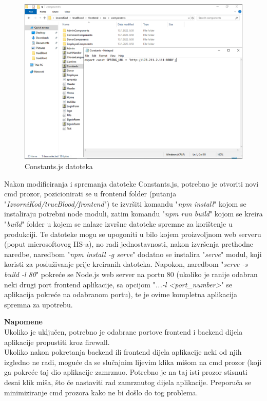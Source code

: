 			\begin{figure}[H]
			\centering
			\includegraphics[width=\textwidth, scale=0.5]{slike/ConstantsJs}
			\caption{Constants.js datoteka}
			\label{fig:ConstantsJs}
			\end{figure}
			
			Nakon modificiranja i spremanja datoteke Constants.js, potrebno je otvoriti novi cmd prozor, pozicionirati se u frontend folder (putanja "\textit{IzvorniKod/trueBlood/frontend}") te izvršiti komandu "\textit{npm install}" kojom se instaliraju potrebni node moduli, zatim komandu "\textit{npm run build}" kojom se kreira "\textit{build}" folder u kojem se nalaze izvršne datoteke spremne za korištenje u produkciji. Te datoteke mogu se upogoniti u bilo kojem proizvoljnom web serveru (poput microsoftovog IIS-a), no radi jednostavnosti, nakon izvršenja prethodne naredbe, naredbom "\textit{npm install -g serve}" dodatno se instalira "\textit{serve}" modul, koji koristi za posluživanje prije kreiranih datoteka. Napokon, naredbom "\textit{serve -s build -l 80}" pokreće se Node.js web server na portu 80 (ukoliko je ranije odabran neki drugi port frontend aplikacije, sa opcijom "\textit{...-l <port_number>}" se aplikacija pokreće na odabranom portu), te je ovime kompletna aplikacija spremna za upotrebu.
			
			\textbf{Napomene}\\
			
			Ukoliko je uključen, potrebno je odabrane portove frontend i backend dijela aplikacije propustiti kroz firewall.\\
			Ukoliko nakon pokretanja backend ili frontend dijela aplikacije neki od njih izgledno ne radi, moguće da se slučajnim lijevim klika mišom na cmd prozor (koji ga pokreće taj dio aplikacije zamrznuo. Potrebno je na taj isti prozor stisnuti desni klik miša, što će nastaviti rad zamrznutog dijela aplikacije. Preporuča se minimiziranje cmd prozora kako ne bi došlo do tog problema.\\
			
			
			\eject 